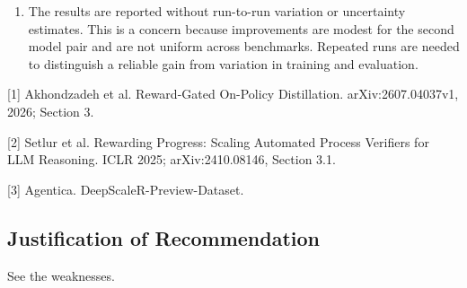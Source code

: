 \begin{enumerate}
\item The results are reported without run-to-run variation or uncertainty estimates. This is a concern because improvements are modest for the second model pair and are not uniform across benchmarks. Repeated runs are needed to distinguish a reliable gain from variation in training and evaluation.
\par{}
\begin{responsebox}[frametitle={Response to W5}]
\vspace*{2\baselineskip}
\end{responsebox}

\end{enumerate}

[1] Akhondzadeh et al. Reward-Gated On-Policy Distillation. arXiv:2607.04037v1, 2026; Section 3.

[2] Setlur et al. Rewarding Progress: Scaling Automated Process Verifiers for LLM Reasoning. ICLR 2025; arXiv:2410.08146, Section 3.1.

[3] Agentica. DeepScaleR-Preview-Dataset.

\subsection*{Justification of Recommendation}
See the weaknesses.

